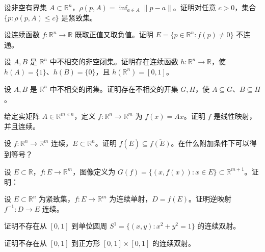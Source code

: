 \noindent\begin{minipage}{\textwidth}
设非空有界集 $A\subset\mathbb R^n$，$\rho(p,A)=\inf_{a\in A}\|p-a\|$。证明对任意 $c>0$，集合 $\{p:\rho(p,A)\le c\}$ 是紧致集。
\end{minipage}\par\vfill
\noindent\begin{minipage}{\textwidth}
设连续函数 $f:\mathbb R^n\to\mathbb R$ 既取正值又取负值。证明 $E=\{p\in\mathbb R^n:f(p)\ne0\}$ 不连通。
\end{minipage}\par\vfill
\newpage
\noindent\begin{minipage}{\textwidth}
设 $A,B$ 是 $\mathbb R^n$ 中不相交的非空闭集。证明存在连续函数 $h:\mathbb R^n\to\mathbb R$，使 $h(A)=\{1\}$、$h(B)=\{0\}$，且 $h(\mathbb R^n)=[0,1]$。
\end{minipage}\par\vfill
\noindent\begin{minipage}{\textwidth}
设 $A,B$ 是 $\mathbb R^n$ 中不相交的闭集。证明存在不相交的开集 $G,H$，使 $A\subseteq G$、$B\subseteq H$。
\end{minipage}\par\vfill
\noindent\begin{minipage}{\textwidth}
给定实矩阵 $A\in\mathbb R^{m\times n}$，定义 $f:\mathbb R^n\to\mathbb R^m$ 为 $f(x)=Ax$。证明 $f$ 是线性映射，并且连续。
\end{minipage}\par\vfill
\newpage
\noindent\begin{minipage}{\textwidth}
设 $f:\mathbb R^n\to\mathbb R^m$ 连续，$E\subset\mathbb R^n$。证明 $f(\overline E)\subseteq\overline{f(E)}$。在什么附加条件下可以得到等号？
\end{minipage}\par\vfill
\noindent\begin{minipage}{\textwidth}
设 $E\subset\mathbb R$，$f:E\to\mathbb R^m$，图像定义为 $G(f)=\{(x,f(x)):x\in E\}\subset\mathbb R^{m+1}$。证明：
\end{minipage}\par\vfill
\noindent\begin{minipage}{\textwidth}
设 $E\subset\mathbb R^n$ 为紧致集，$f:E\to\mathbb R^m$ 为连续单射，$D=f(E)$。证明逆映射 $f^{-1}:D\to E$ 连续。
\end{minipage}\par\vfill
\newpage
\noindent\begin{minipage}{\textwidth}
证明不存在从 $[0,1]$ 到单位圆周 $S^1=\{(x,y):x^2+y^2=1\}$ 的连续双射。
\end{minipage}\par\vfill
\noindent\begin{minipage}{\textwidth}
证明不存在从 $[0,1]$ 到正方形 $[0,1]\times[0,1]$ 的连续双射。
\end{minipage}\par\vfill
